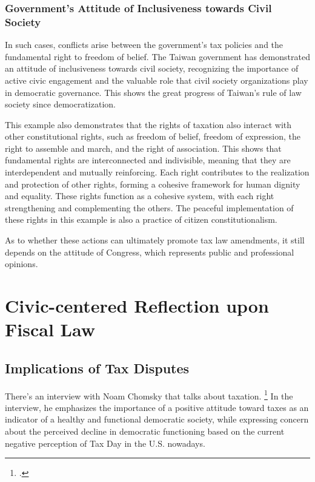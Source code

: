 \documentclass[]{article}
\begin{document}
\subsubsection{Government's Attitude of Inclusiveness towards Civil Society}

In such cases, conflicts arise between the government's tax policies and the fundamental right to freedom of belief. 
The Taiwan government has demonstrated an attitude of inclusiveness towards civil society, recognizing the importance of active civic engagement and the valuable role that civil society organizations play in democratic governance. This shows the great progress of Taiwan's rule of law society since democratization.

This example also demonstrates that the rights of taxation also interact with other constitutional rights, such as freedom of belief, freedom of expression, the right to assemble and march, and the right of association. This shows that fundamental rights are interconnected and indivisible, meaning that they are interdependent and mutually reinforcing. Each right contributes to the realization and protection of other rights, forming a cohesive framework for human dignity and equality. These rights function as a cohesive system, with each right strengthening and complementing the others. 
The peaceful implementation of these rights in this example is also a practice of citizen constitutionalism. 

As to whether these actions can ultimately promote tax law amendments, it still depends on the attitude of Congress, which represents public and professional opinions.

\section{Civic-centered Reflection upon Fiscal Law}

\subsection{Implications of Tax Disputes}

There's an interview with Noam Chomsky that talks about taxation.
\footcite{Citizensgateway2013}
In the interview, he emphasizes the importance of a positive attitude toward taxes as an indicator of a healthy and functional democratic society, while expressing concern about the perceived decline in democratic functioning based on the current negative perception of Tax Day in the U.S. nowadays.
\end{document}
